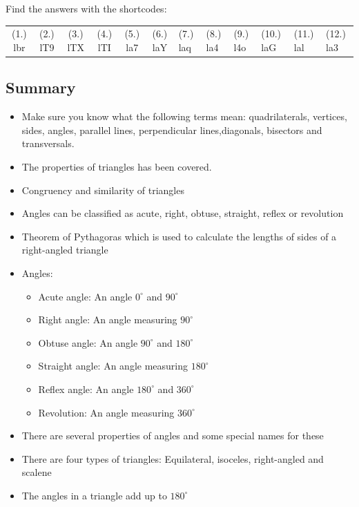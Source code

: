   \label{m39358**end}
  \label{84e7e983e7dc2060d6909eddb5375c22**end}
\par {} Find the answers with the shortcodes:
 \par \begin{tabular}[h]{cccccc}
 (1.) lbr  &  (2.) lT9  &  (3.) lTX  &  (4.) lTI  &  (5.) la7  &  (6.) laY  &  (7.) laq  &  (8.) la4  &  (9.) l4o  &  (10.) laG  &  (11.) lal  &  (12.) la3  & \end{tabular}
    \label{m39368*eip-514}
            \subsection{ Summary}
            \nopagebreak
            \label{m39368*eip-439}\begin{itemize}[noitemsep]
            \item Make sure you know what the following terms mean: quadrilaterals, vertices, sides, angles, parallel lines, perpendicular lines,diagonals, bisectors and transversals.\item The properties of triangles has been covered.\item Congruency and similarity of triangles\item Angles can be classified as acute, right, obtuse, straight, reflex or revolution\item Theorem of Pythagoras which is used to calculate the lengths of sides of a right-angled triangle\item Angles: \label{m39368*id98732}\begin{itemize}[noitemsep]
            \item Acute angle: An angle ${0}^{\circ }$ and ${90}^{\circ }$\item Right angle: An angle measuring ${90}^{\circ }$\item Obtuse angle: An angle ${90}^{\circ }$ and ${180}^{\circ }$\item Straight angle: An angle measuring ${180}^{\circ }$\item Reflex angle: An angle ${180}^{\circ }$ and ${360}^{\circ }$\item Revolution: An angle measuring ${360}^{\circ }$\end{itemize}
        \item There are several properties of angles and some special names for these\item There are four types of triangles: Equilateral, isoceles, right-angled and scalene\item The angles in a triangle add up to ${180}^{\circ }$\end{itemize}
        \label{m39368*cid6}
